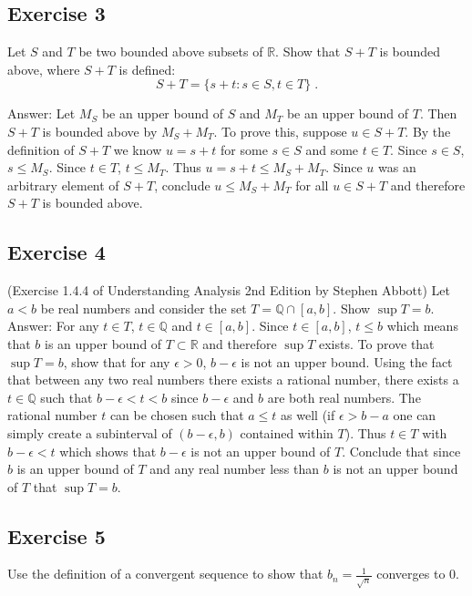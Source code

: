 \documentclass{article}
\begin{document}
\subsection*{Exercise 3}

Let $S$ and $T$ be two bounded above subsets of $\mathbb{R}$. Show that $S+T$ is bounded above, where $S+T$ is defined:
$$
S+T = \{s + t : s\in S, t \in T\} \;.
$$

Answer: Let $M_S$ be an upper bound of $S$ and $M_T$ be an upper bound of $T$. Then $S+T$ is bounded above by $M_S + M_T$. To prove this, suppose $u \in S+T$. By the definition of $S+T$ we know $u = s+t$ for some $s \in S$ and some $t \in T$. Since $s \in S$, $s \leq M_S$. Since $t \in T$, $t \leq M_T$. Thus $u = s+t \leq M_S + M_T$. Since $u$ was an arbitrary element of $S+T$, conclude $u \leq M_S + M_T$ for all $u \in S+T$ and therefore $S+T$ is bounded above.

\subsection*{Exercise 4}

(Exercise 1.4.4 of Understanding Analysis 2nd Edition by Stephen Abbott) Let $a<b$ be real numbers and consider the set $T = \mathbb{Q} \cap [a,b]$. Show $\sup T = b$. \\

Answer: For any $t \in T$, $t \in \mathbb{Q}$ and $t \in [a,b]$. Since $t \in [a,b]$, $t \leq b$ which means that $b$ is an upper bound of $T \subset \mathbb{R}$ and therefore $\sup T$ exists. To prove that $\sup T = b$, show that for any $\epsilon > 0$, $b - \epsilon$ is not an upper bound. Using the fact that between any two real numbers there exists a rational number, there exists a $t \in \mathbb{Q}$ such that $b-\epsilon < t < b$ since $b-\epsilon$ and $b$ are both real numbers. The rational number $t$ can be chosen such that $a\leq t$ as well (if $\epsilon > b-a$ one can simply create a subinterval of $(b-\epsilon, b)$ contained within $T$). Thus $t \in T$ with $b-\epsilon < t$ which shows that $b-\epsilon$ is not an upper bound of $T$. Conclude that since $b$ is an upper bound of $T$ and any real number less than $b$ is not an upper bound of $T$ that $\sup T = b$. 

\subsection*{Exercise 5}

Use the definition of a convergent sequence to show that $b_n = \frac{1}{\sqrt{n}}$ converges to $0$. \\
\end{document}
